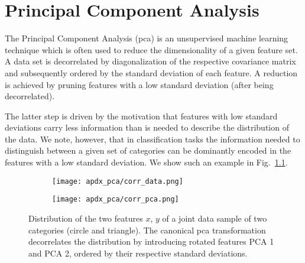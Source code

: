 \chapter{Principal Component Analysis}
\label{chap:pca}
The Principal Component Analysis (\gls{pca}) is an unsupervised machine learning technique which is often used to reduce the dimensionality of a given feature set.
A data set is decorrelated by diagonalization of the respective covariance matrix and subsequently ordered by the standard deviation of each feature.
A reduction is achieved by pruning features with a low standard deviation (after being decorrelated).

The latter step is driven by the motivation that features with low standard deviations carry less information than is needed to describe the distribution of the data.
We note, however, that in classification tasks the information needed to distinguish between a given set of categories can be dominantly encoded in the features with a low standard deviation.
We show such an example in Fig.~\ref{fig:apdx_pca}.
\begin{figure}[htbp]
    \centering
    \begin{subfigure}{.49\textwidth}
        \centering
        \texttt{[image: apdx\_pca/corr\_data.png]}
    \end{subfigure}
    \begin{subfigure}{.49\textwidth}
        \centering
        \texttt{[image: apdx\_pca/corr\_pca.png]}
    \end{subfigure}
    \caption{Distribution of the two features $x$, $y$ of a joint data sample of two categories (circle and triangle). The canonical \gls{pca} transformation decorrelates the distribution by introducing rotated features PCA 1 and PCA 2, ordered by their respective standard deviations.}
    \label{fig:apdx_pca}
\end{figure}

